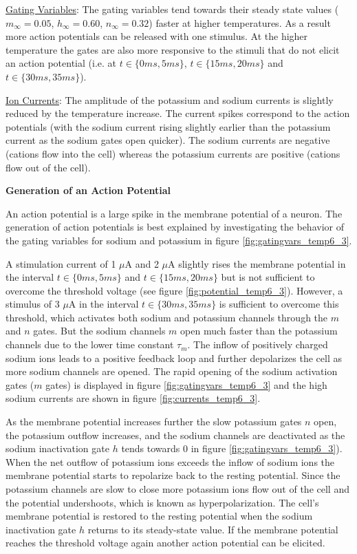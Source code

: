 \documentclass{scrartcl}
\begin{document}
\underline{Gating Variables}: The gating variables tend towards their steady state values ($m_\infty=0.05$, $h_\infty=0.60$, $n_\infty=0.32$) faster at higher temperatures. As a result more action potentials can be released with one stimulus. At the higher temperature the gates are also more responsive to the stimuli that do not elicit an action potential (i.e. at $t \in \{0ms, 5ms\}$, $t \in \{15ms, 20ms\}$ and $t \in \{30ms, 35ms\}$). 

\underline{Ion Currents}: The amplitude of the potassium and sodium currents is slightly reduced by the temperature increase. The current spikes correspond to the action potentials (with the sodium current rising slightly earlier than the potassium current as the sodium gates open quicker). The sodium currents are negative (cations flow into the cell) whereas the potassium currents are positive (cations flow out of the cell). 

\textbf{Generation of an Action Potential}

An action potential is a large spike in the membrane potential of a neuron. The generation of action potentials is best explained by investigating the behavior of the gating variables for sodium and potassium in figure \ref{fig:gatingvars_temp6_3}. 

A stimulation current of 1 $\mu$A and 2 $\mu$A slightly rises the membrane potential in the interval $t \in \{0ms, 5ms\}$ and $t \in \{15ms, 20ms\}$ but is not sufficient to overcome the threshold voltage (see figure \ref{fig:potential_temp6_3}). However, a stimulus of 3 $\mu$A in the interval $t \in \{30ms, 35ms\}$ is sufficient to overcome this threshold, which activates both sodium and potassium channels through the $m$ and $n$ gates. But the sodium channels $m$ open much faster than the potassium channels due to the lower time constant $\tau_m$. The inflow of positively charged sodium ions leads to a positive feedback loop and further depolarizes the cell as more sodium channels are opened. The rapid opening of the sodium activation gates ($m$ gates) is displayed in figure \ref{fig:gatingvars_temp6_3} and the high sodium currents are shown in figure \ref{fig:currents_temp6_3}.

As the membrane potential increases further the slow potassium gates $n$ open, the potassium outflow increases, and the sodium channels are deactivated as the sodium inactivation gate $h$ tends towards 0 in figure \ref{fig:gatingvars_temp6_3}). When the net outflow of potassium ions exceeds the inflow of sodium ions the membrane potential starts to repolarize back to the resting potential. Since the potassium channels are slow to close more potassium ions flow out of the cell and the potential undershoots, which is known as hyperpolarization. The cell's membrane potential is restored to the resting potential when the sodium inactivation gate $h$ returns to its steady-state value. If the membrane potential reaches the threshold voltage again another action potential can be elicited. 
\end{document}
